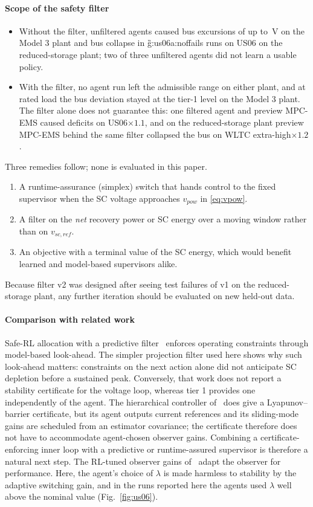 \paragraph{Scope of the safety filter}
\begin{itemize}
\item Without the filter, unfiltered agents caused bus excursions of up to \,V on the Model 3 plant and bus collapse in \G{g:us06a:noffails} runs on US06 on the reduced-storage plant; two of three unfiltered agents did not learn a usable policy.
\item With the filter, no agent run left the admissible range on either plant, and at rated load the bus deviation stayed at the tier-1 level on the Model 3 plant. The filter alone does not guarantee this: one filtered agent and preview MPC-EMS caused deficits on US06$\times1.1$, and on the reduced-storage plant preview MPC-EMS behind the same filter collapsed the bus on WLTC extra-high$\times1.2$.
\end{itemize}
Three remedies follow; none is evaluated in this paper.
\begin{enumerate}
\item A runtime-assurance (simplex) switch that hands control to the fixed supervisor when the SC voltage approaches $v_{pow}$ in \eqref{eq:vpow}.
\item A filter on the \emph{net} recovery power or SC energy over a moving window rather than on $v_{sc,ref}$.
\item An objective with a terminal value of the SC energy, which would benefit learned and model-based supervisors alike.
\end{enumerate}
Because filter v2 was designed after seeing test failures of v1 on the reduced-storage plant, any further iteration should be evaluated on new held-out data.

\paragraph{Comparison with related work}
Safe-RL allocation with a predictive filter~\cite{xu2025safe} enforces operating constraints through model-based look-ahead. The simpler projection filter used here shows why such look-ahead matters: constraints on the next action alone did not anticipate SC depletion before a sustained peak. Conversely, that work does not report a stability certificate for the voltage loop, whereas tier 1 provides one independently of the agent. The hierarchical controller of~\cite{jouili2026cbf} does give a Lyapunov--barrier certificate, but its agent outputs current references and its sliding-mode gains are scheduled from an estimator covariance; the certificate therefore does not have to accommodate agent-chosen observer gains. Combining a certificate-enforcing inner loop with a predictive or runtime-assured supervisor is therefore a natural next step. The RL-tuned observer gains of~\cite{choi2024dob,luna2026} adapt the observer for performance. Here, the agent's choice of $\lambda$ is made harmless to stability by the adaptive switching gain, and in the runs reported here the agents used $\lambda$ well above the nominal value (Fig.~\ref{fig:us06}).

